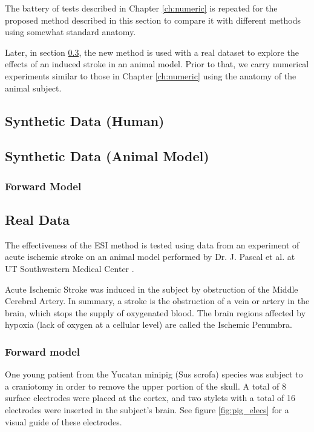 The battery of tests described in Chapter \ref{ch:numeric} is repeated for the proposed method described in this section to compare it with different methods using somewhat standard anatomy.

Later, in section \ref{sec:real_data}, the new method is used with a real dataset to explore the effects of an induced stroke in an animal model.
%
Prior to that, we carry numerical experiments similar to those in Chapter \ref{ch:numeric} using the anatomy of the animal subject.

\subsection{Synthetic Data (Human)}

\subsection{Synthetic Data (Animal Model)}

\subsubsection{Forward Model}

\subsection{Real Data}
\label{sec:real_data}

The effectiveness of the ESI method is tested using data from an experiment of acute ischemic stroke on an animal model performed by Dr. J. Pascal et al. at UT Southwestern Medical Center \cite{pig_lesion1, PMID_36109613}.

Acute Ischemic Stroke was induced in the subject by obstruction of the Middle Cerebral Artery.
%
In summary, a stroke is the obstruction of a vein or artery in the brain, which stops the supply of oxygenated blood.
%
The brain regions affected by hypoxia (lack of oxygen at a cellular level) are called the Ischemic Penumbra.

\subsubsection{Forward model}

One young patient from the Yucatan minipig (Sus scrofa) species was subject to a craniotomy in order to remove the upper portion of the skull.
%
A total of 8 surface electrodes were placed at the cortex, and two stylets with a total of 16 electrodes were inserted in the subject's brain.
%
See figure \ref{fig:pig_elecs} for a visual guide of these electrodes.

